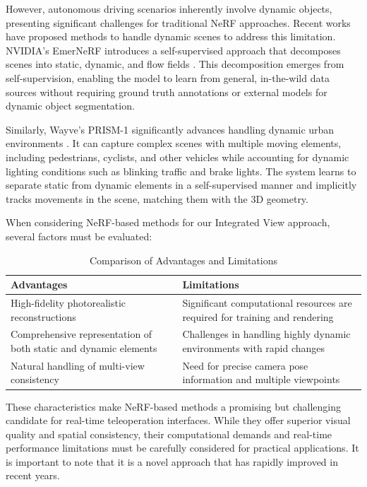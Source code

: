 However, autonomous driving scenarios inherently involve dynamic objects, presenting significant challenges for traditional \ac{NeRF} approaches. Recent works have proposed methods to handle dynamic scenes to address this limitation. NVIDIA's EmerNeRF introduces a self-supervised approach that decomposes scenes into static, dynamic, and flow fields \cite{yang2023emernerf}. This decomposition emerges from self-supervision, enabling the model to learn from general, in-the-wild data sources without requiring ground truth annotations or external models for dynamic object segmentation.

Similarly, Wayve's PRISM-1 significantly advances handling dynamic urban environments \cite{prism2024wayve}. It can capture complex scenes with multiple moving elements, including pedestrians, cyclists, and other vehicles while accounting for dynamic lighting conditions such as blinking traffic and brake lights. The system learns to separate static from dynamic elements in a self-supervised manner and implicitly tracks movements in the scene, matching them with the 3D geometry.

When considering \ac{NeRF}-based methods for our Integrated View approach, several factors must be evaluated:

\begin{table}[h!]
    \centering
    \begin{tabular}{|p{7cm}|p{7cm}|}
    \hline
    \textbf{Advantages} & \textbf{Limitations} \\ \hline
    High-fidelity photorealistic reconstructions & Significant computational resources are required for training and rendering \\ \hline
    Comprehensive representation of both static and dynamic elements & Challenges in handling highly dynamic environments with rapid changes \\ \hline
    Natural handling of multi-view consistency & Need for precise camera pose information and multiple viewpoints \\ \hline
    \end{tabular}
    \caption{Comparison of Advantages and Limitations}
    \label{table:advantages_limitations}
\end{table}

These characteristics make \ac{NeRF}-based methods a promising but challenging candidate for real-time teleoperation interfaces. While they offer superior visual quality and spatial consistency, their computational demands and real-time performance limitations must be carefully considered for practical applications. It is important to note that it is a novel approach that has rapidly improved in recent years.


